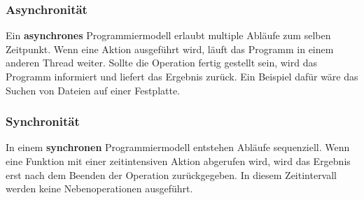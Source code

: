\subsubsection{Asynchronität}

Ein \textbf{asynchrones} Programmiermodell erlaubt multiple Abläufe zum selben Zeitpunkt. Wenn eine Aktion ausgeführt wird, läuft das Programm in einem anderen \glqq Thread\grqq{} weiter. Sollte die Operation fertig gestellt sein, wird das Programm informiert und liefert das Ergebnis zurück. Ein Beispiel dafür wäre das Suchen von Dateien auf einer Festplatte.\cite{asynchronitaet}

\subsubsection{Synchronität}

In einem \textbf{synchronen} Programmiermodell entstehen Abläufe sequenziell. Wenn eine Funktion mit einer zeitintensiven Aktion abgerufen wird, wird das Ergebnis erst nach dem Beenden der Operation zurückgegeben. In diesem Zeitintervall werden keine Nebenoperationen ausgeführt.\cite{asynchronitaet}